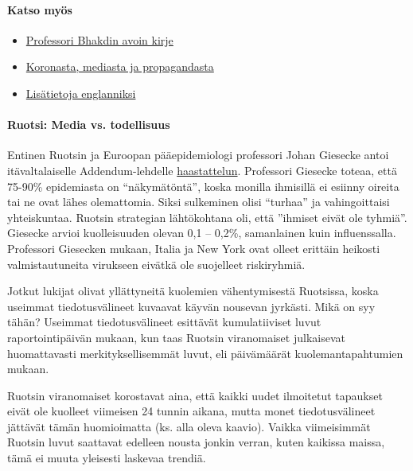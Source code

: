 \hypertarget{katso-myuxf6s}{%
\paragraph{Katso myös}\label{katso-myuxf6s}}

\begin{itemize}
\tightlist
\item
  \href{https://swprs.org/open-letter-from-professor-sucharit-bhakdi-to-german-chancellor-dr-angela-merkel/}{Professori
  Bhakdin avoin kirje}
\item
  \href{https://swprs.org/koronasta-mediasta-ja-propagandasta/}{Koronasta,
  mediasta ja propagandasta}
\item
  \href{https://swprs.org/a-swiss-doctor-on-covid-19/}{Lisätietoja
  englanniksi}
\end{itemize}

\hypertarget{ruotsi-media-vs-todellisuus}{%
\paragraph{\texorpdfstring{\textbf{Ruotsi: Media vs.
todellisuus}}{Ruotsi: Media vs. todellisuus}}\label{ruotsi-media-vs-todellisuus}}

Entinen Ruotsin ja Euroopan pääepidemiologi professori Johan Giesecke
antoi itävaltalaiselle Addendum-lehdelle
\href{https://www.addendum.org/coronavirus/interview-johan-giesecke/}{haastattelun}.
Professori Giesecke toteaa, että 75-90\% epidemiasta on ``näkymätöntä'',
koska monilla ihmisillä ei esiinny oireita tai ne ovat lähes
olemattomia. Siksi sulkeminen olisi ``turhaa'' ja vahingoittaisi
yhteiskuntaa. Ruotsin strategian lähtökohtana oli, että ''ihmiset eivät
ole tyhmiä''. Giesecke arvioi kuolleisuuden olevan 0,1 -- 0,2\%,
samanlainen kuin influenssalla. Professori Giesecken mukaan, Italia ja
New York ovat olleet erittäin heikosti valmistautuneita virukseen
eivätkä ole suojelleet riskiryhmiä.

Jotkut lukijat olivat yllättyneitä kuolemien vähentymisestä Ruotsissa,
koska useimmat tiedotusvälineet kuvaavat käyvän nousevan jyrkästi. Mikä
on syy tähän? Useimmat tiedotusvälineet esittävät kumulatiiviset luvut
raportointipäivän mukaan, kun taas Ruotsin viranomaiset julkaisevat
huomattavasti merkityksellisemmät luvut, eli päivämäärät
kuolemantapahtumien mukaan.

Ruotsin viranomaiset korostavat aina, että kaikki uudet ilmoitetut
tapaukset eivät ole kuolleet viimeisen 24 tunnin aikana, mutta monet
tiedotusvälineet jättävät tämän huomioimatta (ks. alla oleva kaavio).
Vaikka viimeisimmät Ruotsin luvut saattavat edelleen nousta jonkin
verran, kuten kaikissa maissa, tämä ei muuta yleisesti laskevaa trendiä.

